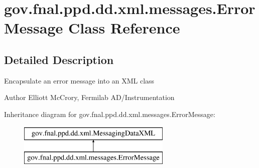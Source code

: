 \hypertarget{classgov_1_1fnal_1_1ppd_1_1dd_1_1xml_1_1messages_1_1ErrorMessage}{\section{gov.\-fnal.\-ppd.\-dd.\-xml.\-messages.\-Error\-Message Class Reference}
\label{classgov_1_1fnal_1_1ppd_1_1dd_1_1xml_1_1messages_1_1ErrorMessage}
}


\subsection{Detailed Description}
Encapsulate an error message into an X\-M\-L class

\begin{DoxyAuthor}{Author}
Elliott Mc\-Crory, Fermilab A\-D/\-Instrumentation 
\end{DoxyAuthor}
Inheritance diagram for gov.\-fnal.\-ppd.\-dd.\-xml.\-messages.\-Error\-Message\-:\begin{figure}[H]
\begin{center}
\leavevmode
\includegraphics[height=2.000000cm]{classgov_1_1fnal_1_1ppd_1_1dd_1_1xml_1_1messages_1_1ErrorMessage}
\end{center}
\end{figure}
